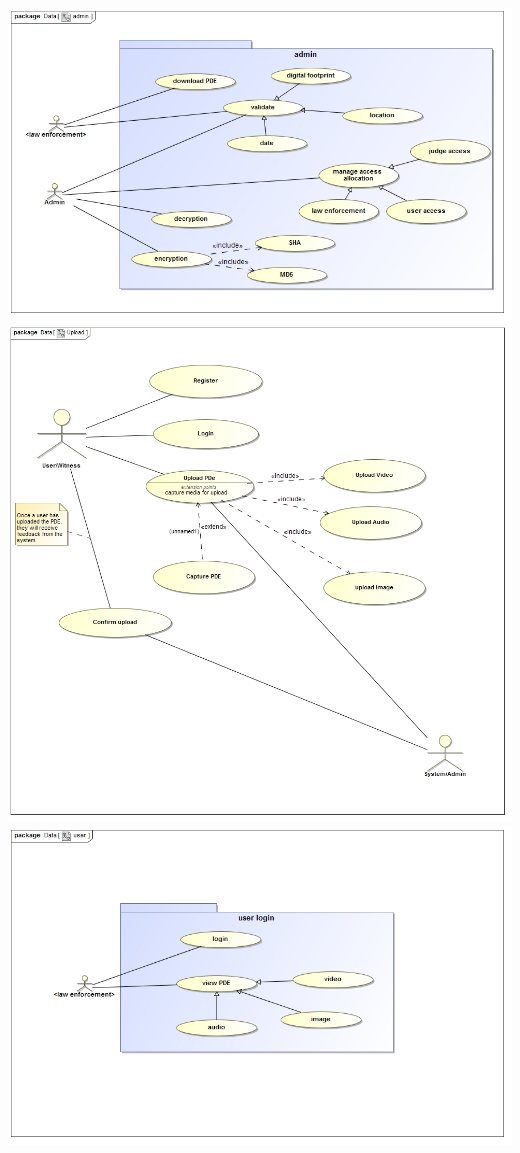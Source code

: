 \documentclass[a4paper,12pt]{article}
\begin{document}
\includegraphics[width=1.0\textwidth]{images/admin.jpg}
\includegraphics[width=1.0\textwidth]{images/upload.jpg}
\includegraphics[width=1.0\textwidth]{images/user.jpg}
\end{document}
